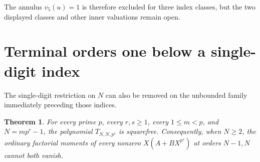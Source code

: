 \documentclass[11pt]{article}
\newtheorem{theorem}{Theorem}
\begin{document}
The annulus $v_5(u)=1$ is therefore excluded for three index classes,
but the two displayed classes and other inner valuations remain open.

\section{Terminal orders one below a single-digit index}
The single-digit restriction on $N$ can also be removed on the
unbounded family immediately preceding those indices.

\begin{theorem}\label{thm:minusone}
For every prime $p$, every $r,s\ge1$, every $1\le m<p$, and
$N=mp^r-1$, the polynomial $T_{N,N,p^s}$ is squarefree.
Consequently, when $N\ge2$, the ordinary factorial moments of every
nonzero $X(A+BX^{p^s})$ at orders $N-1,N$ cannot both vanish.
\end{theorem}
\end{document}
